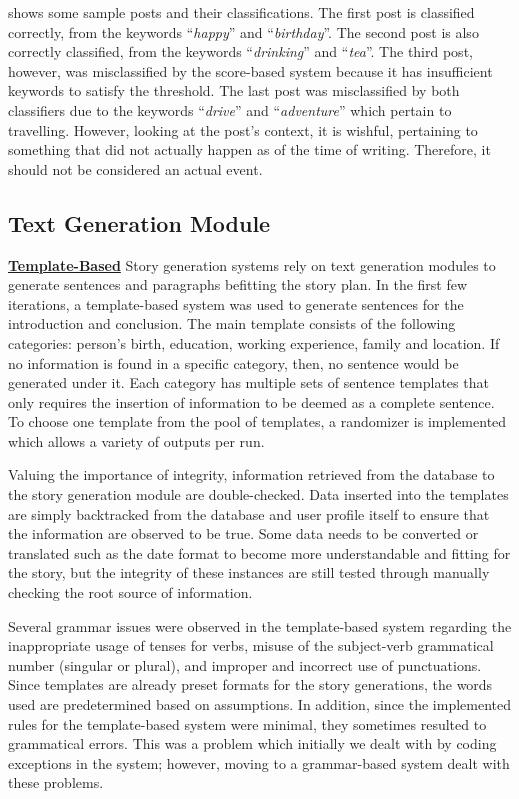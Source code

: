  shows some sample posts and their classifications. The first post is classified correctly, from the keywords ``\textit{happy}” and ``\textit{birthday}”. The second post is also correctly classified, from the keywords ``\textit{drinking}” and ``\textit{tea}”. The third post, however, was misclassified by the score-based system because it has insufficient keywords to satisfy the threshold. The last post was misclassified by both classifiers due to the keywords ``\textit{drive}” and ``\textit{adventure}” which pertain to travelling. However, looking at the post’s context, it is wishful, pertaining to something that did not actually happen as of the time of writing. Therefore, it should not be considered an actual event.

\subsection{Text Generation Module}
\underline{\textbf{Template-Based}}
Story generation systems rely on text generation modules to generate sentences and paragraphs befitting the story plan. In the first few iterations, a template-based system was used to generate sentences for the introduction and conclusion. The main template consists of the following categories: person’s birth, education, working experience, family and location. If no information is found in a specific category, then, no sentence would be generated under it. Each category has multiple sets of sentence templates that only requires the insertion of information to be deemed as a complete sentence. To choose one template from the pool of templates, a randomizer is implemented which allows a variety of outputs per run.

Valuing the importance of integrity, information retrieved from the database to the story generation module are double-checked. Data inserted into the templates are simply backtracked from the database and user profile itself to ensure that the information are observed to be true. Some data needs to be converted or translated such as the date format to become more understandable and fitting for the story, but the integrity of these instances are still tested through manually checking the root source of information.

Several grammar issues were observed in the template-based system regarding the inappropriate usage of tenses for verbs, misuse of the subject-verb grammatical number (singular or plural), and improper and incorrect use of punctuations. Since templates are already preset formats for the story generations, the words used are predetermined based on assumptions. In addition, since the implemented rules for the template-based system were minimal, they sometimes resulted to grammatical errors. This was a problem which initially we dealt with by coding exceptions in the system; however, moving to a grammar-based system dealt with these problems.

